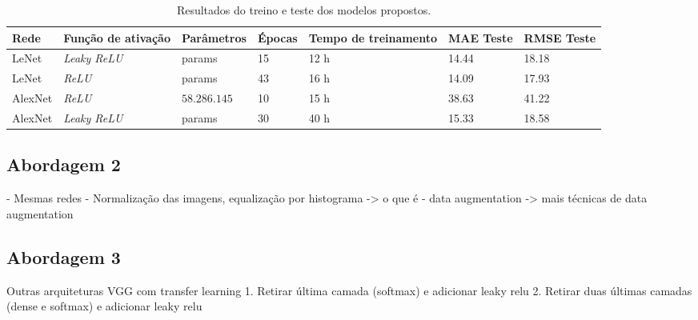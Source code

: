 \begin{table}[!ht]
	\caption{Resultados do treino e teste dos modelos propostos.}
	\label{tab:results-2}
	\begin{adjustbox}{width=1\textwidth}
		\begin{tabular}{l l l l l l l}
			\toprule
			Rede & Função de ativação & Parâmetros & Épocas & Tempo de treinamento & MAE Teste & RMSE Teste \\
			\midrule
			LeNet & \emph{Leaky ReLU} & params & 15 & 12 h & 14.44 & 18.18 \\
			LeNet & \emph{ReLU} & params & 43 & 16 h & 14.09 & 17.93 \\
			AlexNet & \emph{ReLU} & $58.286.145$ & 10 & 15 h & 38.63 & 41.22 \\
			AlexNet & \emph{Leaky ReLU} & params & 30 & 40 h & 15.33 & 18.58 \\
		\end{tabular}
	\end{adjustbox}
\end{table}

\subsection{Abordagem 2}

- Mesmas redes
- Normalização das imagens, equalização por histograma -> o que é
- data augmentation ->  mais técnicas de data augmentation

\subsection{Abordagem 3}

Outras arquiteturas
VGG
com transfer learning
1. Retirar última camada (softmax) e adicionar leaky relu
2. Retirar duas últimas camadas (dense e softmax) e adicionar leaky relu
